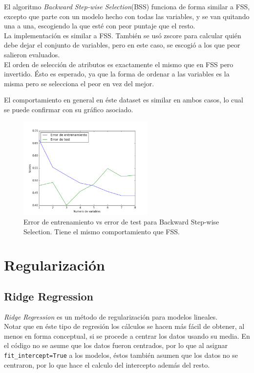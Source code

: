 \documentclass[letter, 10pt]{article}
\begin{document}
El algoritmo \textit{Backward Step-wise Selection}(BSS) funciona de forma
similar a FSS, excepto que parte con un modelo hecho con todas las variables, y
se van quitando una a una, escogiendo la que esté con peor puntaje que el resto.\\

La implementación es similar a FSS. También se usó zscore para calcular quién
debe dejar el conjunto de variables, pero en este caso, se escogió a los que
peor salieron evaluados.\\


El orden de selección de atributos es exactamente el mismo que en FSS pero
invertido. Ésto es esperado, ya que la forma de ordenar a las variables es la
misma pero se selecciona el peor en vez del mejor.

El comportamiento en general en éste dataset es similar en ambos casos, lo cual
se puede confirmar con su gráfico asociado.

\begin{figure}[H]
  \centering
 \includegraphics[width=0.6\textwidth]{Images/p2_fig2} 
  \caption{Error de entrenamiento vs error de test para Backward Step-wise
    Selection. Tiene el mismo comportamiento que FSS.}
  \label{fig:p2_g2}
\end{figure}
\section{Regularización}

\subsection{Ridge Regression}
\textit{Ridge Regression} es un método de regularización para modelos
lineales.\\

Notar que en éste tipo de regresión los cálculos se hacen más fácil de obtener,
al menos en forma conceptual, si se procede a centrar los datos usando su media.
En el código no se asume que los datos fueron centrados, por lo que al asignar
\texttt{fit\_intercept=True} a los modelos, éstos también asumen que los datos no
se centraron, por lo que hace el calculo del intercepto además del resto.
\end{document}
